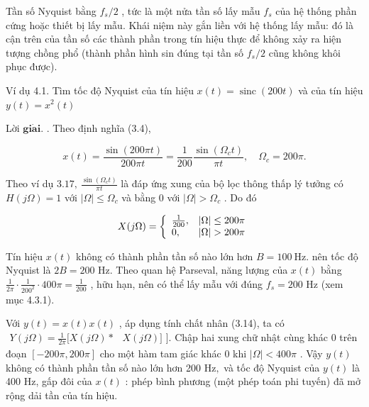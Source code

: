 \documentclass[
  10
]{article}
\begin{document}
Tần số Nyquist bằng \(f _ { s } / 2\) , tức là một nửa tần số lấy mẫu
\(f _ { s }\) của hệ thống phần cứng hoặc thiết bị lấy mẫu. Khái niệm
này gắn liền với hệ thống lấy mẫu: đó là cận trên của tần số các thành
phần trong tín hiệu thực để không xảy ra hiện tượng chồng phổ (thành
phần hình sin đúng tại tần số \(f _ { s } / 2\) cũng không khôi phục
được).

Ví dụ 4.1. Tìm tốc độ Nyquist của tín hiệu
\(x ( t ) = \operatorname { s i n c } ( 2 0 0 t )\) và của tín hiệu
\(y ( t ) = x ^ { 2 } ( t )\)

Lời \(\mathbf { g i } \mathbf { \dot { a } } \mathbf { i } .\) . Theo
định nghĩa (3.4),

\[
x (t) = \frac {\sin (2 0 0 \pi t)}{2 0 0 \pi t} = \frac {1}{2 0 0} \frac {\sin (\Omega_ {c} t)}{\pi t}, \quad \Omega_ {c} = 2 0 0 \pi .
\]

Theo ví dụ \(3 . 1 7 , \ \frac { \sin ( \Omega _ { c } t ) } { \pi t }\)
là đáp ứng xung của bộ lọc thông thấp lý tưởng có \(H ( j \Omega ) = 1\)
với \(| \Omega | \leq \Omega _ { c }\) và bằng 0 với
\(| \Omega | > \Omega _ { c }\) . Do đó

\[
X (j \Omega) = \left\{ \begin{array}{l l} \frac {1}{2 0 0}, & | \Omega | \leq 2 0 0 \pi \\ 0, & | \Omega | > 2 0 0 \pi \end{array} \right.
\]

Tín hiệu \(x ( t )\) không có thành phần tần số nào lớn hơn
\(B = 1 0 0 ~ \mathrm { H z } .\) nên tốc độ Nyquist là \(2 B = 2 0 0\)
Hz. Theo quan hệ Parseval, năng lượng của \(x ( t )\) bằng
\(\textstyle { \frac { 1 } { 2 \pi } } \cdot { \frac { 1 } { 2 0 0 ^ { 2 } } } \cdot 4 0 0 \pi = { \frac { 1 } { 2 0 0 } }\)
, hữu hạn, nên có thể lấy mẫu với đúng \(f _ { s } = 2 0 0\) Hz (xem mục
4.3.1).

Với \(y ( t ) = x ( t ) x ( t )\) , áp dụng tính chất nhân (3.14), ta có
\(\begin{array} { r } { Y ( j \Omega ) = \frac { 1 } { 2 \pi } [ X ( j \Omega ) * } \end{array}\)
\(X ( j \Omega ) ]\) {]}. Chập hai xung chữ nhật cùng khác 0 trên đoạn
\([ - 2 0 0 \pi , 2 0 0 \pi ]\) cho một hàm tam giác khác 0 khi
\(| \Omega | < 4 0 0 \pi\) . Vậy \(y ( t )\) không có thành phần tần số
nào lớn hơn 200 \(\mathrm { H z , }\) và tốc độ Nyquist của \(y ( t )\)
là 400 Hz, gấp đôi của \(x ( t )\) : phép bình phương (một phép toán phi
tuyến) đã mở rộng dải tần của tín hiệu. 
\end{document}
